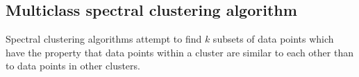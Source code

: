 \subsection{Multiclass spectral clustering algorithm}
\label{subsec:multiclass}
Spectral clustering algorithms attempt to find $k$ subsets of data points which have the property that data points within a cluster are similar to each other than to data points in other clusters. 


